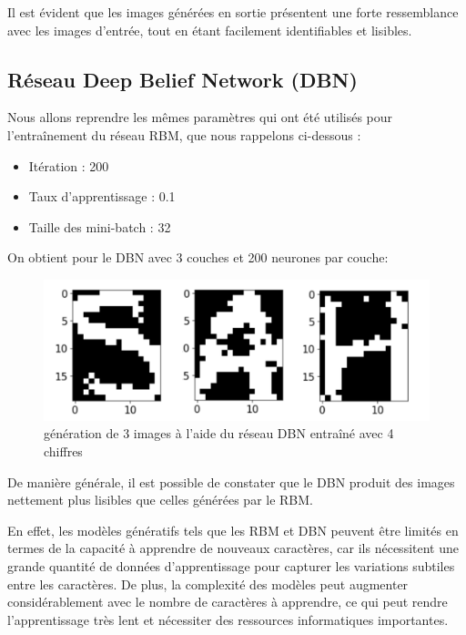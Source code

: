 Il est évident que les images générées en sortie présentent une forte ressemblance avec les images d'entrée, tout en étant facilement identifiables et lisibles.

\subsection{Réseau Deep Belief Network (DBN)}
Nous allons reprendre les mêmes paramètres qui ont été utilisés pour l'entraînement du réseau RBM, que nous rappelons ci-dessous :
\begin{itemize}
    \item Itération : 200
    \item Taux d'apprentissage : 0.1
    \item Taille des mini-batch : 32
\end{itemize}
 
On obtient pour le DBN avec 3 couches et
200 neurones par couche:

\begin{figure}[H]\includegraphics[width=140mm]{images/DBN.png}
\caption{génération de 3 images à l'aide du réseau DBN entraîné avec 4 chiffres}
\end{figure}

De manière générale, il est possible de constater que le DBN produit des images nettement plus lisibles que celles générées par le RBM.

En effet, les modèles génératifs tels que les RBM et DBN peuvent être limités en termes de la capacité à apprendre de nouveaux caractères, car ils nécessitent une grande quantité de données d'apprentissage pour capturer les variations subtiles entre les caractères. De plus, la complexité des modèles peut augmenter considérablement avec le nombre de caractères à apprendre, ce qui peut rendre l'apprentissage très lent et nécessiter des ressources informatiques importantes.
     
